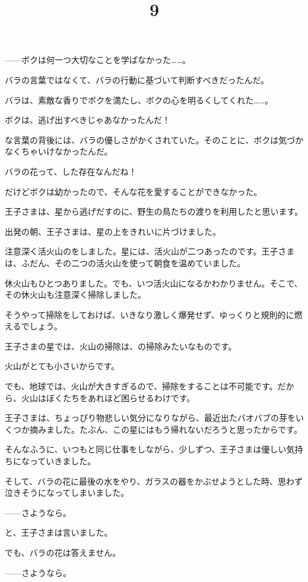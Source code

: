 ——ボクは何一つ大切なことを学ばなかった……。

バラの言葉ではなくて、バラの行動に基づいて判断すべきだったんだ。

バラは、素敵な香りでボクを満たし、ボクの心を明るくしてくれた……。

ボクは、逃げ出すべきじゃあなかったんだ！

な言葉の背後には、バラの優しさがかくされていた。そのことに、ボクは気づかなくちゃいけなかったんだ。

バラの花って、した存在なんだね！

だけどボクは幼かったので、そんな花を愛することができなかった。

\title{9}


王子さまは、星から逃げだすのに、野生の鳥たちの渡りを利用したと思います。

出発の朝、王子さまは、星の上をきれいに片づけました。

注意深く活火山のをしました。星には、活火山が二つあったのです。王子さまは、ふだん、その二つの活火山を使って朝食を温めていました。

休火山もひとつありました。でも、いつ活火山になるかわかりません。そこで、その休火山も注意深く掃除しました。

そうやって掃除をしておけば、いきなり激しく爆発せず、ゆっくりと規則的に燃えるでしょう。

王子さまの星では、火山の掃除は、の掃除みたいなものです。


火山がとても小さいからです。

でも、地球では、火山が大きすぎるので、掃除をすることは不可能です。だから、火山はぼくたちをあれほど困らせるわけです。

王子さまは、ちょっぴり物悲しい気分になりながら、最近出たバオバブの芽をいくつか摘みました。たぶん、この星にはもう帰れないだろうと思ったからです。

そんなふうに、いつもと同じ仕事をしながら、少しずつ、王子さまは優しい気持ちになっていきました。

そして、バラの花に最後の水をやり、ガラスの器をかぶせようとした時、思わず泣きそうになってしまいました。

——さようなら。

と、王子さまは言いました。

でも、バラの花は答えません。

——さようなら。

